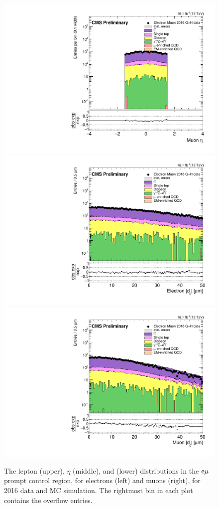 \begin{figure}[hbtp]
\includegraphics[scale=0.3]{figures/selection/pcr_emu_2016/muonEta.pdf}
\includegraphics[scale=0.3]{figures/selection/pcr_emu_2016/electronAbsD0_50um.pdf}
\includegraphics[scale=0.3]{figures/selection/pcr_emu_2016/muonAbsD0_50um.pdf}
\caption{The lepton \pt (upper), $\eta$ (middle), and \ad (lower) distributions in the $\mathrm{e}{\mu}$ prompt control region, for electrons (left) and muons (right), for 2016 data and MC simulation. The rightmost bin in each plot
contains the overflow entries.}
\label{pcr_emu_2016}
\end{figure}